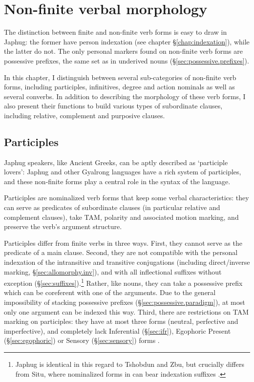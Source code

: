 \chapter{Non-finite verbal morphology} \label{chap:non-finite}
The distinction between finite and non-finite verb forms is easy to draw in Japhug: the former have person indexation (see chapter §\ref{chap:indexation}), while the latter do not. The only personal markers found on non-finite verb forms are possessive prefixes, the same set as in underived nouns (§\ref{sec:possessive.prefixes}).

In this chapter, I distinguish between several sub-categories of non-finite verb forms, including participles, infinitives, degree and action nominals as well as several converbs. In addition to describing the morphology of these verb forms, I also present their functions to build various types of subordinate clauses, including relative, complement and purposive clauses.

\section{Participles} \label{sec:participles}
Japhug speakers, like Ancient Greeks, can be aptly described as  `participle lovers': Japhug and other Gyalrong languages have a rich system of participles, and these non-finite forms play a central role in the syntax of the language.

Participles are nominalized verb forms that keep some verbal characteristics: they can serve as predicates of subordinate clauses (in particular relative and complement clauses), take TAM, polarity and associated motion marking, and preserve the verb's argument structure.

Participles differ from finite verbs in three ways. First, they cannot serve as the predicate of a main clause. Second, they are not compatible with the personal indexation of the intransitive and transitive conjugations (including direct/inverse marking, §\ref{sec:allomorphy.inv}), and with all inflectional suffixes without exception (§\ref{sec:suffixes}).\footnote{Japhug is identical in this regard to Tshobdun and Zbu, but crucially differs from Situ, where nominalized forms in  can bear indexation suffixes \citep{jackson06guanxiju,jacksonlin07}. } Rather, like nouns, they can take a possessive prefix which can be coreferent with one of the arguments. Due to the general impossibility of stacking possessive prefixes (§\ref{sec:possessive.paradigm}), at most only one argument can be indexed this way. Third, there are restrictions on TAM marking on participles: they have at most three forms (neutral, perfective and imperfective), and completely lack Inferential (§\ref{sec:ifr}), Egophoric Present (§\ref{sec:egophoric}) or Sensory (§\ref{sec:sensory}) forms .

